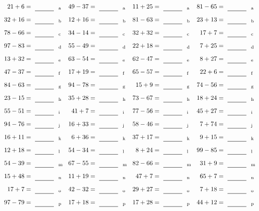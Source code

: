 \documentclass
[
  draft    = true,
  fontsize = 11pt,
  parskip  = half-
]
{scrartcl}
\begin{document}
\clearpage
\begin{align*}
    \pline{21+6}&=\rline{a}
  & \pline{49-37}&=\rline{a}
  & \pline{11+25}&=\rline{a}
  & \pline{81-65}&=\rline{a} \\[1ex]
    \pline{32+16}&=\rline{b}
  & \pline{12+16}&=\rline{b}
  & \pline{81-63}&=\rline{b}
  & \pline{23+13}&=\rline{b} \\[1ex]
    \pline{78-66}&=\rline{c}
  & \pline{34-14}&=\rline{c}
  & \pline{32+32}&=\rline{c}
  & \pline{17+7}&=\rline{c} \\[1ex]
    \pline{97-83}&=\rline{d}
  & \pline{55-49}&=\rline{d}
  & \pline{22+18}&=\rline{d}
  & \pline{7+25}&=\rline{d} \\[1ex]
    \pline{13+32}&=\rline{e}
  & \pline{63-54}&=\rline{e}
  & \pline{62-47}&=\rline{e}
  & \pline{8+27}&=\rline{e} \\[1ex]
    \pline{47-37}&=\rline{f}
  & \pline{17+19}&=\rline{f}
  & \pline{65-57}&=\rline{f}
  & \pline{22+6}&=\rline{f} \\[1ex]
    \pline{84-63}&=\rline{g}
  & \pline{94-78}&=\rline{g}
  & \pline{15+9}&=\rline{g}
  & \pline{74-56}&=\rline{g} \\[1ex]
    \pline{23-15}&=\rline{h}
  & \pline{35+28}&=\rline{h}
  & \pline{73-67}&=\rline{h}
  & \pline{18+24}&=\rline{h} \\[1ex]
    \pline{55-51}&=\rline{i}
  & \pline{41+7}&=\rline{i}
  & \pline{77-56}&=\rline{i}
  & \pline{45+27}&=\rline{i} \\[1ex]
    \pline{94-76}&=\rline{j}
  & \pline{16+33}&=\rline{j}
  & \pline{58-46}&=\rline{j}
  & \pline{7+74}&=\rline{j} \\[1ex]
    \pline{16+11}&=\rline{k}
  & \pline{6+36}&=\rline{k}
  & \pline{37+17}&=\rline{k}
  & \pline{9+15}&=\rline{k} \\[1ex]
    \pline{12+18}&=\rline{l}
  & \pline{54-34}&=\rline{l}
  & \pline{8+24}&=\rline{l}
  & \pline{99-85}&=\rline{l} \\[1ex]
    \pline{54-39}&=\rline{m}
  & \pline{67-55}&=\rline{m}
  & \pline{82-66}&=\rline{m}
  & \pline{31+9}&=\rline{m} \\[1ex]
    \pline{15+48}&=\rline{n}
  & \pline{11+19}&=\rline{n}
  & \pline{47+7}&=\rline{n}
  & \pline{65+7}&=\rline{n} \\[1ex]
    \pline{17+7}&=\rline{o}
  & \pline{42-32}&=\rline{o}
  & \pline{29+27}&=\rline{o}
  & \pline{7+18}&=\rline{o} \\[1ex]
    \pline{97-79}&=\rline{p}
  & \pline{17+18}&=\rline{p}
  & \pline{17+28}&=\rline{p}
  & \pline{44+12}&=\rline{p}
\end{align*}
\end{document}
